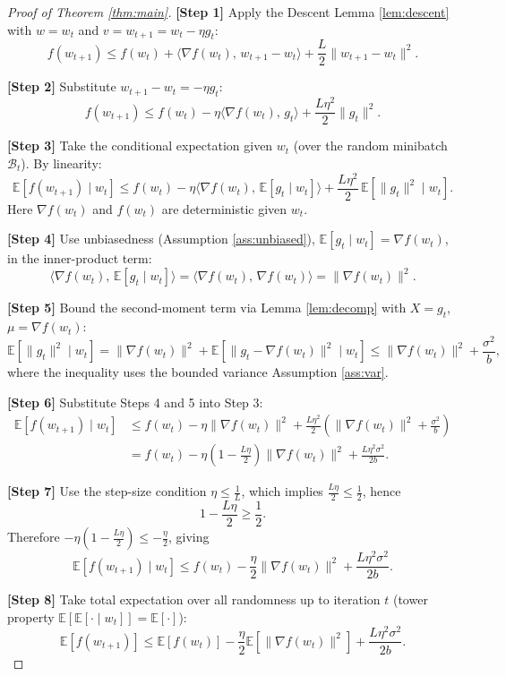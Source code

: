 \documentclass{article}
\begin{document}
\begin{proof}[Proof of Theorem \ref{thm:main}]

\textbf{[Step 1]} Apply the Descent Lemma \ref{lem:descent} with $w = w_t$ and $v = w_{t+1} = w_t - \eta g_t$:
\[
f(w_{t+1}) \leq f(w_t) + \langle \nabla f(w_t),\, w_{t+1} - w_t\rangle + \frac{L}{2}\|w_{t+1} - w_t\|^2.
\]

\textbf{[Step 2]} Substitute $w_{t+1} - w_t = -\eta g_t$:
\[
f(w_{t+1}) \leq f(w_t) - \eta \langle \nabla f(w_t),\, g_t\rangle + \frac{L\eta^2}{2}\|g_t\|^2.
\]

\textbf{[Step 3]} Take the conditional expectation given $w_t$ (over the random minibatch $\mathcal{B}_t$). By linearity:
\[
\mathbb{E}[f(w_{t+1}) \mid w_t]
\leq f(w_t) - \eta \langle \nabla f(w_t),\, \mathbb{E}[g_t \mid w_t]\rangle + \frac{L\eta^2}{2}\,\mathbb{E}[\|g_t\|^2 \mid w_t].
\]
Here $\nabla f(w_t)$ and $f(w_t)$ are deterministic given $w_t$.

\textbf{[Step 4]} Use unbiasedness (Assumption \ref{ass:unbiased}), $\mathbb{E}[g_t \mid w_t] = \nabla f(w_t)$, in the inner-product term:
\[
\langle \nabla f(w_t),\, \mathbb{E}[g_t \mid w_t]\rangle = \langle \nabla f(w_t),\, \nabla f(w_t)\rangle = \|\nabla f(w_t)\|^2.
\]

\textbf{[Step 5]} Bound the second-moment term via Lemma \ref{lem:decomp} with $X=g_t$, $\mu = \nabla f(w_t)$:
\[
\mathbb{E}[\|g_t\|^2 \mid w_t] = \|\nabla f(w_t)\|^2 + \mathbb{E}[\|g_t - \nabla f(w_t)\|^2 \mid w_t]
\leq \|\nabla f(w_t)\|^2 + \frac{\sigma^2}{b},
\]
where the inequality uses the bounded variance Assumption \ref{ass:var}.

\textbf{[Step 6]} Substitute Steps 4 and 5 into Step 3:
\begin{align*}
\mathbb{E}[f(w_{t+1}) \mid w_t]
&\leq f(w_t) - \eta \|\nabla f(w_t)\|^2 + \frac{L\eta^2}{2}\left(\|\nabla f(w_t)\|^2 + \frac{\sigma^2}{b}\right) \\
&= f(w_t) - \eta\left(1 - \frac{L\eta}{2}\right)\|\nabla f(w_t)\|^2 + \frac{L\eta^2 \sigma^2}{2b}.
\end{align*}

\textbf{[Step 7]} Use the step-size condition $\eta \leq \frac{1}{L}$, which implies $\frac{L\eta}{2} \leq \frac{1}{2}$, hence
\[
1 - \frac{L\eta}{2} \geq \frac{1}{2}.
\]
Therefore $-\eta\left(1 - \frac{L\eta}{2}\right) \leq -\frac{\eta}{2}$, giving
\[
\mathbb{E}[f(w_{t+1}) \mid w_t] \leq f(w_t) - \frac{\eta}{2}\|\nabla f(w_t)\|^2 + \frac{L\eta^2 \sigma^2}{2b}.
\]

\textbf{[Step 8]} Take total expectation over all randomness up to iteration $t$ (tower property $\mathbb{E}[\mathbb{E}[\cdot\mid w_t]] = \mathbb{E}[\cdot]$):
\[
\mathbb{E}[f(w_{t+1})] \leq \mathbb{E}[f(w_t)] - \frac{\eta}{2}\mathbb{E}[\|\nabla f(w_t)\|^2] + \frac{L\eta^2 \sigma^2}{2b}.
\]


\end{proof}
\end{document}
